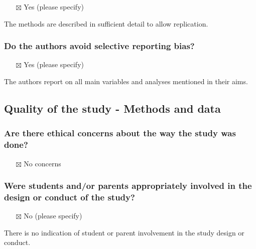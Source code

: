 \documentclass[
  doc, a4paper]{apa7}
\providecommand{\tightlist}{%
  \setlength{\itemsep}{0pt}\setlength{\parskip}{0pt}}
\begin{document}
\begin{itemize}
\tightlist
\item[$\boxtimes$]
  Yes (please specify)
\end{itemize}

The methods are described in sufficient detail to allow replication.

\subsubsection{Do the authors avoid selective reporting bias?}\label{do-the-authors-avoid-selective-reporting-bias}

\begin{itemize}
\tightlist
\item[$\boxtimes$]
  Yes (please specify)
\end{itemize}

The authors report on all main variables and analyses mentioned in their aims.

\subsection{Quality of the study - Methods and data}\label{quality-of-the-study---methods-and-data}

\subsubsection{Are there ethical concerns about the way the study was done?}\label{are-there-ethical-concerns-about-the-way-the-study-was-done}

\begin{itemize}
\tightlist
\item[$\boxtimes$]
  No concerns
\end{itemize}

\subsubsection{Were students and/or parents appropriately involved in the design or conduct of the study?}\label{were-students-andor-parents-appropriately-involved-in-the-design-or-conduct-of-the-study}

\begin{itemize}
\tightlist
\item[$\boxtimes$]
  No (please specify)
\end{itemize}

There is no indication of student or parent involvement in the study design or conduct.
\end{document}
